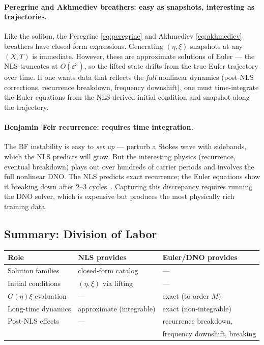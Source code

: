 \documentclass[11pt]{article}
\newcommand{\eps}{\varepsilon}
\begin{document}
\paragraph{Peregrine and Akhmediev breathers: easy as snapshots, interesting as trajectories.}
Like the soliton, the Peregrine \eqref{eq:peregrine} and Akhmediev
\eqref{eq:akhmediev} breathers have closed-form expressions.
Generating $(\eta,\xi)$ snapshots at any $(X,T)$ is immediate.
However, these are approximate solutions of Euler --- the NLS truncates
at $O(\eps^3)$, so the lifted state drifts from the true Euler
trajectory over time.
If one wants data that reflects the \emph{full} nonlinear dynamics
(post-NLS corrections, recurrence breakdown, frequency downshift),
one must time-integrate the Euler equations from the NLS-derived
initial condition and snapshot along the trajectory.

\paragraph{Benjamin--Feir recurrence: requires time integration.}
The BF instability is easy to \emph{set up} --- perturb a Stokes
wave with sidebands, which the NLS predicts will grow.
But the interesting physics (recurrence, eventual breakdown) plays out
over hundreds of carrier periods and involves the full nonlinear DNO.
The NLS predicts exact recurrence; the Euler equations show it
breaking down after 2--3 cycles~\cite{xu2009}.
Capturing this discrepancy requires running the DNO solver, which is
expensive but produces the most physically rich training data.

\subsection{Summary: Division of Labor}

\begin{center}
\begin{tabular}{@{}lll@{}}
\toprule
\textbf{Role} & \textbf{NLS provides} & \textbf{Euler/DNO provides} \\
\midrule
Solution families & closed-form catalog & --- \\
Initial conditions & $(\eta,\xi)$ via lifting & --- \\
$G(\eta)\xi$ evaluation & --- & exact (to order $M$) \\
Long-time dynamics & approximate (integrable) & exact (non-integrable) \\
Post-NLS effects & --- & recurrence breakdown, \\
 & & frequency downshift, breaking \\
\bottomrule
\end{tabular}
\end{center}
\end{document}

